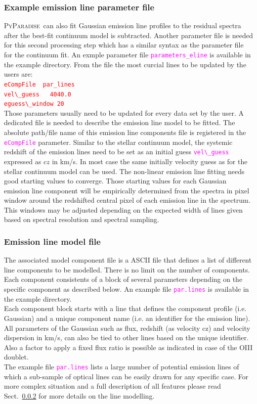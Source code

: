 \documentclass[usenatbib,usegraphicx,useAMS,onecolumn]{mn2e}
\newcommand{\codeline}[1]{\lstinline|#1|}
\newcommand{\fname}[1]{\textcolor{magenta}{\codeline{#1}}}
\newcommand{\PyPar}{\mbox{\textsc{PyParadise}}}
\begin{document}
\subsubsection{Example emission line parameter file}
\PyPar\ can also fit Gaussian emission line profiles to the residual spectra after the best-fit continuum model is subtracted. Another parameter file is needed for this second processing step which has a similar syntax as the parameter file for the continuum fit. An exmple parameter file \fname{parameters_eline} is available in the example directory. From the file the most curcial lines to be updated by the users are:\bigskip\\
\textcolor{red}{\codeline{eCompFile  par_lines}}\\
\textcolor{red}{\codeline{vel\_guess   4040.0}}\\
\textcolor{red}{\codeline{eguess\_window 20}}\bigskip\\
Those parameters usually need to be updated for every data set by the user. A dedicated file is needed to describe the emission line model to be fitted. The absolute path/file name of this emission line components file is registered in the \fname{eCompFile} parameter. Similar to the stellar continuum model, the systemic redshift of the emission lines need to be set as an initial guess \fname{vel\_guess} expressed as $cz$ in km/s. In most case the same initially velocity guess as for the stellar continuum model can be used. The non-linear emission line fitting needs good starting values to converge. Those starting values for each Gaussian emission line component will be empirically determined from the spectra in pixel window around the redshifted central pixel of each emission line in the spectrum. This windows may be adjusted depending on the expected width of lines given based on spectral resolution and spectral sampling. 

\subsubsection{Emission line model file}
The associated model component file is a ASCII file that defines a list of different line components to be modelled. There is no limit on the number of components. Each component consistents of a block of several parameters depending on the specific component as described below. An example file \fname{par.lines} is available in the example directory.\bigskip\\
Each component block starts with a line that defines the component profile (i.e. Gaussian) and a unique component name (i.e. an identifier for the emission line). All parameters of the Gaussian such as flux, redshift (as velocity cz) and velocity dispersion in km/s, can also be tied to other lines based on the unique identifier. Also a factor to apply a fixed flux ratio is possible as indicated in case of the OIII doublet. \bigskip\\
The example file \fname{par.lines} lists a large number of potential emission lines of which a sub-sample of optical lines can be easily drawn for any specific case. For more complex situation and a full description of all features please read Sect.~\ref{} for more details on the line modelling.
\end{document}
